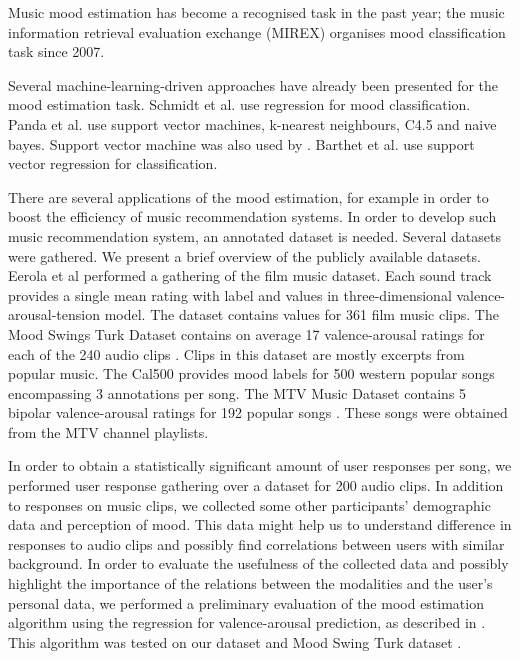 \documentclass[a4paper]{article}
\begin{document}
Music mood estimation has become a recognised task in the past year; the music information retrieval evaluation exchange (MIREX) organises mood classification task since 2007. 

Several machine-learning-driven approaches have already been presented for the mood estimation task. Schmi\-dt et al. \cite{schmidt2009projection} use regression for mood classification. Panda et al. \cite{panda2013multi} use support vector machines, k-nearest neighbours, C4.5 and naive bayes. Support vector machine was also used by \cite{laurier2007audio}. Barthet et al. \cite{barthet2013design} use support vector regression for classification. 

There are several applications of the mood estimation, for example in order to boost the efficiency of music recommendation systems. In order to develop such music recommendation system, an annotated dataset is needed. Several datasets were gathered. We present a brief overview of the publicly available datasets. Eerola et al \cite{eerola2010comparison} performed a gathering of the film music dataset. Each sound track provides a single mean rating with label and values in three-dimensional valence-arousal-tension model. The dataset contains values for 361 film music clips. The Mood Swings Turk Dataset contains on average 17 valence-arousal ratings for each of the 240 audio clips \cite{schmidt2011modeling}. Clips in this dataset are mostly excerpts from popular music. The Cal500 provides mood labels for 500 western popular songs \cite{turnbull2008semantic} encompassing 3 annotations per song. The MTV Music Dataset contains 5 bipolar valence-arousal ratings for 192 popular songs \cite{schuller2010mister}. These songs were obtained from the MTV channel playlists.

In order to obtain a statistically significant amount of user responses per song, we performed user response gathering over a dataset for 200 audio clips. In addition to responses on music clips, we collected some other participants' demographic data and perception of mood. This data might help us to understand difference in responses to audio clips and possibly find correlations between users with similar background. In order to evaluate the usefulness of the collected data and possibly highlight the importance of the relations between the modalities and the user's personal data, we performed a preliminary evaluation of the mood estimation algorithm using the regression for valence-arousal prediction, as described in \cite{schmidt2009projection}. This algorithm was tested on our dataset and Mood Swing Turk dataset \cite{schmidt2011modeling}.
\end{document}
